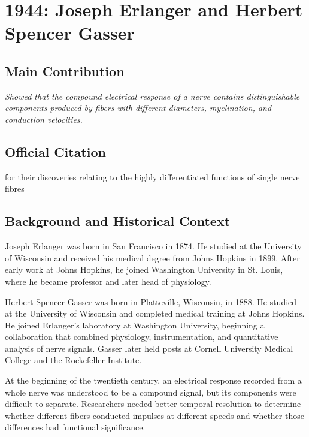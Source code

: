 \chapter[1944 --- Erlanger and Gasser]{1944: Joseph Erlanger and Herbert Spencer Gasser}
\label{ch:1944_Erlanger}

\section*{Main Contribution}

\textit{Showed that the compound electrical response of a nerve contains distinguishable components produced by fibers with different diameters, myelination, and conduction velocities.}\cite{nobel-1944,lecture-1944}

\section{Official Citation}

for their discoveries relating to the highly differentiated functions of single nerve fibres

\section{Background and Historical Context}

Joseph Erlanger was born in San Francisco in 1874. He studied at the University of Wisconsin and received his medical degree from Johns Hopkins in 1899. After early work at Johns Hopkins, he joined Washington University in St. Louis, where he became professor and later head of physiology.

Herbert Spencer Gasser was born in Platteville, Wisconsin, in 1888. He studied at the University of Wisconsin and completed medical training at Johns Hopkins. He joined Erlanger's laboratory at Washington University, beginning a collaboration that combined physiology, instrumentation, and quantitative analysis of nerve signals. Gasser later held posts at Cornell University Medical College and the Rockefeller Institute.

At the beginning of the twentieth century, an electrical response recorded from a whole nerve was understood to be a compound signal, but its components were difficult to separate. Researchers needed better temporal resolution to determine whether different fibers conducted impulses at different speeds and whether those differences had functional significance.

